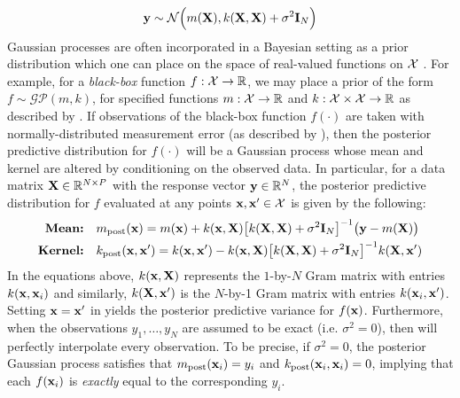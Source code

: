 \documentclass[10pt]{article}
\numberwithin{equation}{section}
\newcommand{\calGP}{\mathcal{GP}}
\begin{document}
\begin{equation}
\label{eq:GP-obs-distribution}
    \mathbf{y} \sim \mathcal{N}\Big(m(\mathbf{X}), k(\mathbf{X}, \mathbf{X}) + \sigma^{2}\mathbf{I}_{N}\Big)
\end{equation}
Gaussian processes are often incorporated in a Bayesian setting as a prior distribution which one can place on the space of real-valued functions on $\mathcal{X}$ \citep{Titsias-SVGP-2009,Alvarez-Vector-Kernels-2012}. For example, for a \emph{black-box} function $f: \mathcal{X} \to \mathbb{R}$, we may place a prior of the form $f \sim \calGP(m, k)$, for specified functions $m: \mathcal{X} \to \mathbb{R}$ and $k: \mathcal{X} \times \mathcal{X} \to \mathbb{R}$ as described by . If observations of the black-box function $f(\cdot)$ are taken with normally-distributed measurement error (as described by ), then the posterior predictive distribution for $f(\cdot)$ will be a Gaussian process whose mean and kernel are altered by conditioning on the observed data. In particular, for a data matrix $\mathbf{X} \in \mathbb{R}^{N \times P}$ with the response vector $\mathbf{y} \in \mathbb{R}^{N}$, the posterior predictive distribution for $f$ evaluated at any points $\mathbf{x}, \mathbf{x}' \in \mathcal{X}$ is given by the following:
\begin{subequations}
    \label{eq:GP-posterior}
    \begin{align}
        \textbf{Mean:} \quad & m_{\textrm{post}}(\bfx) = m(\bfx) + k(\bfx, \bfX)\big[k(\bfX, \bfX) + \sigma^{2}\bfI_{N}\big]^{-1}\big(\bfy - m(\bfX)\big)\label{eq:GP-post-mean}\\%
        \textbf{Kernel:} \quad & k_{\textrm{post}}(\bfx, \bfx') = k(\bfx, \bfx') - k(\bfx, \bfX)\big[k(\bfX, \bfX) + \sigma^{2}\bfI_{N}\big]^{-1}k(\bfX, \bfx')\label{eq:GP-post-kernel}
    \end{align}
\end{subequations}
In the equations above, $k(\mathbf{x}, \mathbf{X})$ represents the $1$-by-$N$ Gram matrix with entries $k(\mathbf{x}, \mathbf{x}_{i})$ and similarly, $k(\mathbf{X}, \mathbf{x}')$ is the $N$-by-1 Gram matrix with entries $k(\mathbf{x}_{i}, \mathbf{x}')$. Setting $\mathbf{x} = \mathbf{x}'$ in  yields the posterior predictive variance for $f(\mathbf{x})$. Furthermore, when the observations $y_{1}, \dots, y_{N}$ are assumed to be exact (i.e. $\sigma^2 = 0$), then  will perfectly interpolate every observation. To be precise, if $\sigma^{2} = 0$, the posterior Gaussian process satisfies that $m_{\textrm{post}}(\mathbf{x}_{i}) = y_{i}$ and $k_{\textrm{post}}(\mathbf{x}_{i}, \mathbf{x}_{i}) = 0$, implying that each $f(\mathbf{x}_{i})$ is \emph{exactly} equal to the corresponding $y_{i}$. 
\end{document}
